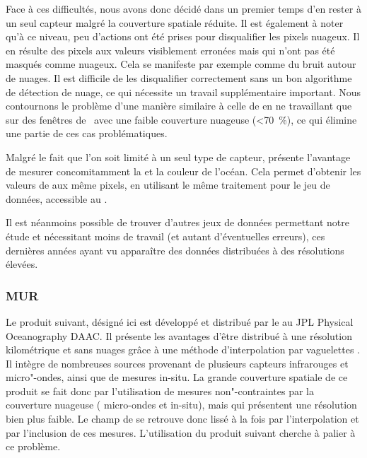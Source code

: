 Face à ces difficultés, nous avons donc décidé dans un premier temps d'en rester à un seul capteur malgré la couverture spatiale réduite.
Il est également à noter qu'à ce niveau, peu d'actions ont été prises pour disqualifier les pixels nuageux.
Il en résulte des pixels aux valeurs visiblement erronées mais qui n'ont pas été masqués comme nuageux.
Cela se manifeste par exemple comme du bruit autour de nuages.
Il est difficile de les disqualifier correctement sans un bon algorithme de détection de nuage, ce qui nécessite un travail supplémentaire important.
Nous contournons le problème d'une manière similaire à celle de \textcite{liu_2016} en ne travaillant que sur des fenêtres de~ avec une faible couverture nuageuse (\textless\qty{70}{\percent}), ce qui élimine une partie de ces cas problématiques.

Malgré le fait que l'on soit limité à un seul type de capteur,  présente l'avantage de mesurer concomitamment la  et la couleur de l'océan.
Cela permet d'obtenir les valeurs de  aux même pixels, en utilisant le même traitement pour le jeu de données, accessible au .

Il est néanmoins possible de trouver d'autres jeux de données permettant notre étude et nécessitant moins de travail (et autant d'éventuelles erreurs), ces dernières années ayant vu apparaître des données distribuées à des résolutions élevées.

\subsubsection{MUR}

Le produit suivant, désigné ici  est développé et distribué par le  au JPL Physical Oceanography DAAC.
Il présente les avantages d'être distribué à une résolution kilométrique et sans nuages grâce à une méthode d'interpolation par vaguelettes \parencite{chin_2017}.
Il intègre de nombreuses sources provenant de plusieurs capteurs infrarouges et micro"-ondes, ainsi que de mesures in-situ.
La grande couverture spatiale de ce produit se fait donc par l'utilisation de mesures non"-contraintes par la couverture nuageuse ( micro-ondes et in-situ), mais qui présentent une résolution bien plus faible.
Le champ de  se retrouve donc lissé à la fois par l'interpolation et par l'inclusion de ces mesures.
L'utilisation du produit suivant cherche à palier à ce problème.

